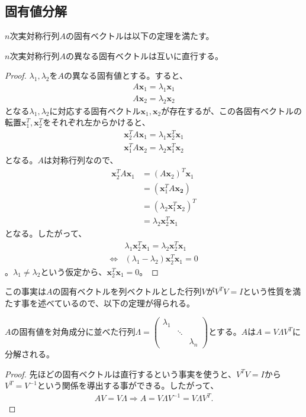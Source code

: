 \subsection{固有値分解}
$n$次実対称行列$A$の固有ベクトルは以下の定理を満たす。
\begin{theorem*}
  $n$次実対称行列$A$の異なる固有ベクトルは互いに直行する。
\end{theorem*}
\begin{proof}
  $\lambda_1,\lambda_2$を$A$の異なる固有値とする。すると、
  \begin{align*}
    A \mathbf{x}_1 = \lambda_1 \mathbf{x}_1 \\
    A \mathbf{x}_2 = \lambda_2 \mathbf{x}_2
  \end{align*}
  となる$\lambda_1, \lambda_2$に対応する固有ベクトル$\mathbf{x}_1, \mathbf{x}_2$が存在するが、この各固有ベクトルの転置$\mathbf{x}_1^T, \mathbf{x}_2^T$をそれぞれ左からかけると、
  \begin{align*}
    \mathbf{x}_2^T A \mathbf{x}_1 = \lambda_1 \mathbf{x}_2^T \mathbf{x}_1 \\
    \mathbf{x}_1^T A \mathbf{x}_2 = \lambda_2 \mathbf{x}_1^T \mathbf{x}_2
  \end{align*}
  となる。$A$は対称行列なので、
  \begin{align*}
    \mathbf{x}_2^T A \mathbf{x}_1 & = \left(A \mathbf{x}_2\right)^T \mathbf{x}_1 \\
                                  & = \left(\mathbf{x}_1^T A \mathbf{x_2}\right) \\
                                  & = \left(\lambda_2 \mathbf{x}_1^T \mathbf{x}_2\right)^T \\
                                  & = \lambda_2 \mathbf{x}_2^T \mathbf{x}_1
  \end{align*}
  となる。したがって、
  \begin{align*}
                    & \lambda_1 \mathbf{x}_2^T \mathbf{x}_1 = \lambda_2 \mathbf{x}_2^T \mathbf{x}_1 \\
    \Leftrightarrow & \left(\lambda_1 - \lambda_2\right) \mathbf{x}_2^T \mathbf{x}_1 = 0
  \end{align*}
  。$\lambda_1 \not= \lambda_2$という仮定から、$\mathbf{x}_2^T \mathbf{x}_1 = 0$。
\end{proof}
この事実は$A$の固有ベクトルを列ベクトルとした行列$V$が$V^T V = I$という性質を満たす事を述べているので、以下の定理が得られる。
\begin{theorem*}
  $A$の固有値を対角成分に並べた行列$\Lambda = \displaystyle{\left(\begin{array}{ccc} \lambda_1 & & \\ & \ddots & \\ & & \lambda_n \end{array}\right)}$とする。$A$は$A = V \Lambda V^T$に分解される。
\end{theorem*}
\begin{proof}
  先ほどの固有ベクトルは直行するという事実を使うと、$V^T V = I$から$V^T = V^{-1}$という関係を導出する事ができる。したがって、
  \begin{align*}
    A V = V \Lambda \Rightarrow A = V \Lambda V^{-1} = V \Lambda V^T.
  \end{align*}
\end{proof}

